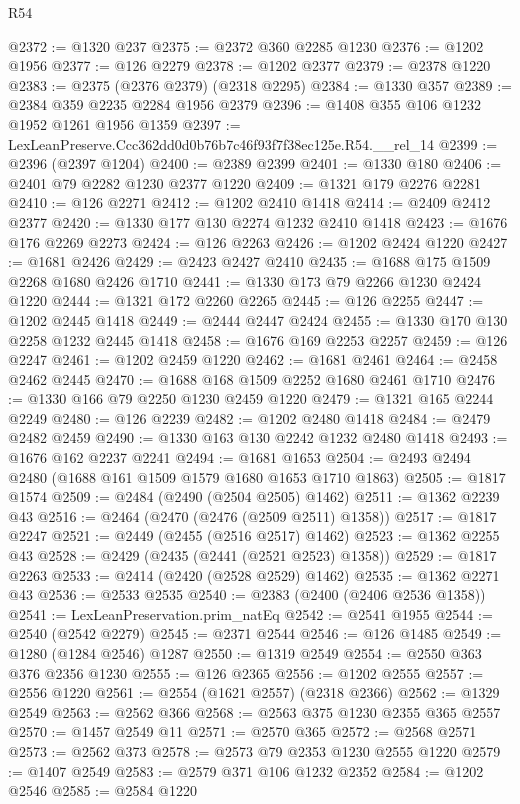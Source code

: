 \begin{lexlean}{R54}
\begin{coremodule}
@2372 := @1320 @237
@2375 := @2372 @360 @2285 @1230
@2376 := @1202 @1956
@2377 := @126 @2279
@2378 := @1202 @2377
@2379 := @2378 @1220
@2383 := @2375 (@2376 @2379) (@2318 @2295)
@2384 := @1330 @357
@2389 := @2384 @359 @2235 @2284 @1956 @2379
@2396 := @1408 @355 @106 @1232 @1952 @1261 @1956 @1359
@2397 := LexLeanPreserve.Ccc362dd0d0b76b7c46f93f7f38ec125e.R54.__rel_14
@2399 := @2396 (@2397 @1204)
@2400 := @2389 @2399
@2401 := @1330 @180
@2406 := @2401 @79 @2282 @1230 @2377 @1220
@2409 := @1321 @179 @2276 @2281
@2410 := @126 @2271
@2412 := @1202 @2410 @1418
@2414 := @2409 @2412 @2377
@2420 := @1330 @177 @130 @2274 @1232 @2410 @1418
@2423 := @1676 @176 @2269 @2273
@2424 := @126 @2263
@2426 := @1202 @2424 @1220
@2427 := @1681 @2426
@2429 := @2423 @2427 @2410
@2435 := @1688 @175 @1509 @2268 @1680 @2426 @1710
@2441 := @1330 @173 @79 @2266 @1230 @2424 @1220
@2444 := @1321 @172 @2260 @2265
@2445 := @126 @2255
@2447 := @1202 @2445 @1418
@2449 := @2444 @2447 @2424
@2455 := @1330 @170 @130 @2258 @1232 @2445 @1418
@2458 := @1676 @169 @2253 @2257
@2459 := @126 @2247
@2461 := @1202 @2459 @1220
@2462 := @1681 @2461
@2464 := @2458 @2462 @2445
@2470 := @1688 @168 @1509 @2252 @1680 @2461 @1710
@2476 := @1330 @166 @79 @2250 @1230 @2459 @1220
@2479 := @1321 @165 @2244 @2249
@2480 := @126 @2239
@2482 := @1202 @2480 @1418
@2484 := @2479 @2482 @2459
@2490 := @1330 @163 @130 @2242 @1232 @2480 @1418
@2493 := @1676 @162 @2237 @2241
@2494 := @1681 @1653
@2504 := @2493 @2494 @2480 (@1688 @161 @1509 @1579 @1680 @1653 @1710 @1863)
@2505 := @1817 @1574
@2509 := @2484 (@2490 (@2504 @2505) @1462)
@2511 := @1362 @2239 @43
@2516 := @2464 (@2470 (@2476 (@2509 @2511) @1358))
@2517 := @1817 @2247
@2521 := @2449 (@2455 (@2516 @2517) @1462)
@2523 := @1362 @2255 @43
@2528 := @2429 (@2435 (@2441 (@2521 @2523) @1358))
@2529 := @1817 @2263
@2533 := @2414 (@2420 (@2528 @2529) @1462)
@2535 := @1362 @2271 @43
@2536 := @2533 @2535
@2540 := @2383 (@2400 (@2406 @2536 @1358))
@2541 := LexLeanPreservation.prim_natEq
@2542 := @2541 @1955
@2544 := @2540 (@2542 @2279)
@2545 := @2371 @2544
@2546 := @126 @1485
@2549 := @1280 (@1284 @2546) @1287
@2550 := @1319 @2549
@2554 := @2550 @363 @376 @2356 @1230
@2555 := @126 @2365
@2556 := @1202 @2555
@2557 := @2556 @1220
@2561 := @2554 (@1621 @2557) (@2318 @2366)
@2562 := @1329 @2549
@2563 := @2562 @366
@2568 := @2563 @375 @1230 @2355 @365 @2557
@2570 := @1457 @2549 @11
@2571 := @2570 @365
@2572 := @2568 @2571
@2573 := @2562 @373
@2578 := @2573 @79 @2353 @1230 @2555 @1220
@2579 := @1407 @2549
@2583 := @2579 @371 @106 @1232 @2352
@2584 := @1202 @2546
@2585 := @2584 @1220

\end{coremodule}
\end{lexlean}
